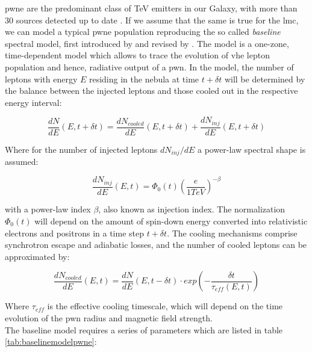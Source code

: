 \documentclass[main.tex]{subfiles}
\begin{document}
\gls{pwne} are the predominant class of TeV emitters in our Galaxy, with more than 30 sources detected up to date \cite{2009TeVreview}. If we assume that the same is true for the \gls{lmc}, we can model a typical \gls{pwne} population reproducing the so called \textit{baseline} spectral model, first introduced by \cite{2012PWNemodel} and revised by \cite{2018hessPWNe}. The model is a one-zone, time-dependent model which allows to trace the evolution of \gls{vhe} lepton population and hence, radiative output of a \gls{pwn}.
In the model, the number of leptons with energy $E$ residing in the nebula at time $t+\delta t$ will be determined by the balance between the injected leptons and those cooled out in the respective energy interval:

\begin{equation}
\frac{dN}{dE}(E, t+\delta t) = \frac{dN_{cooled}}{dE}(E,t+\delta t) + \frac{dN_{inj}}{dE} (E, t+\delta t)  
\end{equation}

Where for the number of injected leptons $dN_{inj}/dE$ a power-law spectral shape is assumed:

\begin{equation}
  \frac{dN_{inj}}{dE}(E,t) = \Phi_{0}(t) \left(\frac{e}{1 TeV} \right)^{-\beta}
\end{equation}

with a power-law index $\beta$, also known as injection index. The normalization $\Phi_0(t)$ will depend on the amount of spin-down energy converted into relativistic electrons and positrons in a time step $t+\delta t$.
The cooling mechanisms comprise synchrotron escape and adiabatic losses, and the number of cooled leptons can be approximated by:

\begin{equation}
  \frac{dN_{cooled}}{dE}(E, t) = \frac{dN}{dE} (E, t-\delta t)\cdot exp \left(-\frac{\delta t}{\tau_{eff}(E,t)} \right)
\end{equation}

Where $\tau_{eff}$ is the effective cooling timescale, which will depend on the time evolution of the \gls{pwn} radius and magnetic field strength.\\
The baseline model requires a series of parameters which are listed in table \ref{tab:baselinemodelpwne}:
\end{document}
